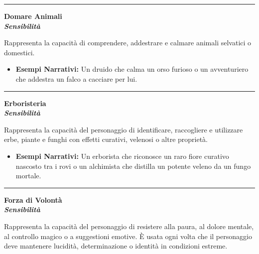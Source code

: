 \documentclass[../manuale_main.tex]{subfiles}
\begin{document}
\vspace{0.5cm}
\noindent
\begin{center}
\rule{\textwidth}{0.4pt} 
\end{center}
\vspace{0.5cm}

\begin{center}
\textbf{\large{Domare Animali}}\\ \textit{\textbf{Sensibilità}}\\
\end{center}
Rappresenta la capacità di comprendere, addestrare e calmare animali selvatici o domestici.

\begin{itemize}
\item \textbf{Esempi Narrativi:} Un druido che calma un orso furioso o un avventuriero che addestra un falco a cacciare per lui.
\end{itemize}


\vspace{0.5cm}
\noindent
\begin{center}
\rule{\textwidth}{0.4pt} 
\end{center}
\vspace{0.5cm}

\begin{center}
\textbf{\large{Erboristeria}}\\ \textit{\textbf{Sensibilità}}\\
\end{center}
Rappresenta la capacità del personaggio di identificare, raccogliere e utilizzare erbe, piante e funghi con effetti curativi, velenosi o altre proprietà.

\begin{itemize}
\item \textbf{Esempi Narrativi:} Un erborista che riconosce un raro fiore curativo nascosto tra i rovi o un alchimista che distilla un potente veleno da un fungo mortale.
\end{itemize}

\vspace{0.5cm}
\noindent
\begin{center}
\rule{\textwidth}{0.4pt} 
\end{center}
\vspace{0.5cm}

\begin{center}
\textbf{\large{Forza di Volontà}}\\ \textit{\textbf{Sensibilità}}\\
\end{center}
Rappresenta la capacità del personaggio di resistere alla paura, al dolore mentale, al controllo magico o a suggestioni emotive. È usata ogni volta che il personaggio deve mantenere lucidità, determinazione o identità in condizioni estreme.
\end{document}
